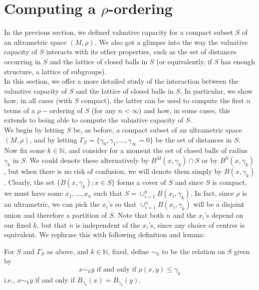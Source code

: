 
\newpage

\section*{Computing a $\rho$-ordering}
In the previous section, we defined valuative capacity for a compact subset $S$ of an ultrametric space $(M, \rho)$. We also got a glimpse into the way the valuative capacity of $S$ interacts with its other properties, such as the set of distances occurring in $S$ and the lattice of closed balls in $S$ (or equivalently, if $S$ has enough structure, a lattice of subgroups).\\

In this section, we offer a more detailed study of the interaction between the valuative capacity of $S$ and the lattice of closed balls in $S$. In particular, we  show how, in all cases (with $S$ compact), the latter can be used to compute the first $n$ terms of a $\rho-$ordering of $S$ (for any $n < \infty$) and how, in some cases, this extends to being able to compute the valuative capacity of $S$.\\

We begin by letting $S$ be, as before,  a compact subset of an ultrametric space $(M, \rho)$, and by letting $\Gamma_S =\{\gamma_0, \gamma_1,\ldots,\gamma_\infty=0\}$ be the set of distances in $S$.  Now fix some $k \in \mathbb{N}$, and consider for a moment the set of closed balls of radius $\gamma_k$ in $S$. We could denote these alternatively by $B^M(x, \gamma_k) \cap S$ or by  $B^S(x, \gamma_k)$, but when there is no risk of confusion, we will denote them simply by $B(x, \gamma_k)$. Clearly, the set  $\{B(x, \gamma_k); x \in S\}$ forms a cover of $S$ and since $S$ is compact, we must have some $x_1,\ldots, x_n$  such that $S= \cup_{i=1}^n B(x_i, \gamma_k)$. In fact,  since $\rho$ is an ultrametric, we can pick the $x_i$'s so that $\cup_{i=1}^n B(x_i, \gamma_k)$ will be a disjoint union and therefore a partition of $S$. Note that both $n$ and the $x_i$'s depend on our fixed $k$, but that $n$ is independent of the $x_i$'s, since any choice of centres is equivalent. We rephrase this with following definition and lemma:

\begin{definition*}
For $S$ and $\Gamma_S$ as above, and $k \in \mathbb{N}$, fixed,  define $\sim_k$ to  be the relation on $S$ given by \[x \sim_k y\text{ if and only if  }\rho(x,y) \leq \gamma_k\] i.e.,  $x \sim_k y$ if and only if $B_{\gamma_k}(x) = B_{\gamma_k}(y)$.
\end{definition*}

